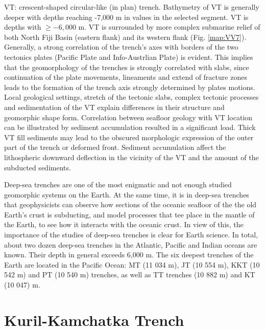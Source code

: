 \documentclass[11pt,a4paper]{report}
\begin{document}
{\ac{VT}: crescent-shaped circular-like (in plan) trench. Bathymetry of \ac{VT} is generally deeper with depths reaching -7,000 m in values in the selected segment. \ac{VT} is depths with $\geq -6,000$ m. \ac{VT} is surrounded by more complex submarine relief of both North Fiji Basin (eastern flank) and its western flank (Fig. \ref{map:VV7}). Generally, a strong correlation of the trench's axes with borders of the two tectonics plates (Pacific Plate and Info-Austrlian Plate) is evident. This implies that the geomorphology of the trenches is strongly correlated with slabs, since continuation of the plate movements, lineaments and extend of fracture zones leads to the formation of the trench axis strongly determined by plates motions. Local geological settings, stretch of the tectonic slabs, complex tectonic processes and sedimentation of the \ac{VT} explain differences in their structure and geomorphic shape form. Correlation between seafloor geology with \ac{VT} location can be illustrated by sediment accumulation resulted in a significant load. Thick \ac{VT} fill sediments may lead to the obscured morphologic expression of the outer part of the trench or deformed front. Sediment accumulation affect the lithospheric downward deflection in the vicinity of the \ac{VT} and the amount of the subducted sediments.

Deep-sea trenches are one of the most enigmatic and not enough studied geomorphic systems on the Earth. At the same time, it is in deep-sea trenches that geophysicists can observe how sections of the oceanic seafloor of the the old Earth's crust is subducting, and model processes that tee place in the mantle of the Earth, to see how it interacts with the oceanic crust. In view of this, the importance of the studies of deep-sea trenches is clear for Earth science. In total, about two dozen deep-sea trenches in the Atlantic, Pacific and Indian oceans are known. Their depth in general exceeds 6,000 m. The six deepest trenches of the Earth are located in the Pacific Ocean: \ac{MT} (11 034 m), \ac{JT} (10 554 m), \ac{KKT} (10 542 m) and \ac{PT} (10 540 m) trenches, as well as \ac{TT} trenches (10 882 m) and \ac{KT} (10 047) m.
\pagebreak
\section{Kuril-Kamchatka Trench}

}
\end{document}
